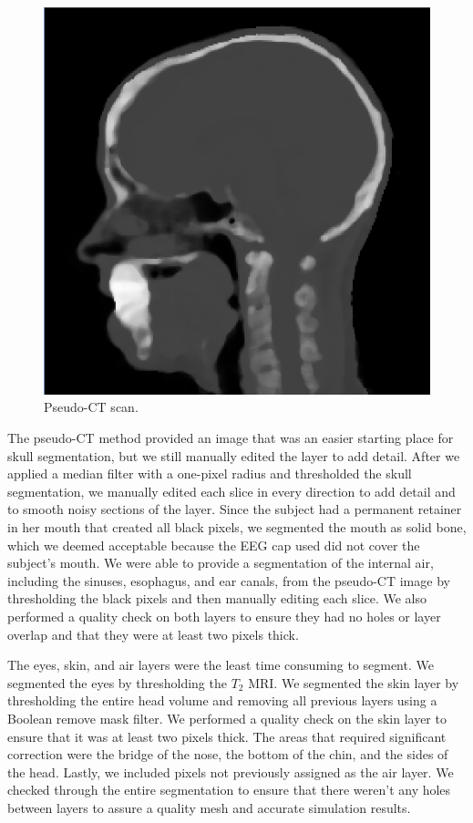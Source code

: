\begin{figure}[H]
\begin{center}
\includegraphics[width=.64\textwidth]{Figures/pseudo_CT}
\caption{Pseudo-CT scan.}
\label{fig:ct}
\end{center}
\end{figure}

The pseudo-CT method provided an image that was an easier starting place for skull segmentation, but we still manually edited the layer to add detail. After we applied a median filter with a one-pixel radius and thresholded the skull segmentation, we manually edited each slice in every direction to add detail and to smooth noisy sections of the layer. Since the subject had a permanent retainer in her mouth that created all black pixels, we segmented the mouth as solid bone, which we deemed acceptable because the EEG cap used did not cover the subject's mouth. We were able to provide a segmentation of the internal air, including the sinuses, esophagus, and ear canals, from the pseudo-CT image by thresholding the black pixels and then manually editing each slice. We also performed a quality check on both layers to ensure they had no holes or layer overlap and that they were at least two pixels thick.

The eyes, skin, and air layers were the least time consuming to segment. We segmented the eyes by thresholding the $T_2$ MRI. We segmented the skin layer by thresholding the entire head volume and removing all previous layers using a Boolean remove mask filter. We performed a quality check on the skin layer to ensure that it was at least two pixels thick. The areas that required significant correction were the bridge of the nose, the bottom of the chin, and the sides of the head. Lastly, we included pixels not previously assigned as the air layer. We checked through the entire segmentation to ensure that there weren't any holes between layers to assure a quality mesh and accurate simulation results. 

